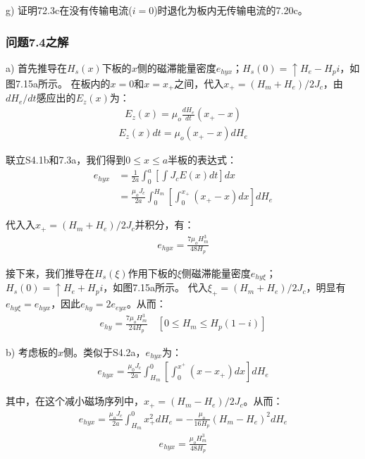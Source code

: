 g) 证明72.3c在没有传输电流($i=0$)时退化为板内无传输电流的7.20c。


\subsubsection{问题7.4之解}
a) 首先推导在$H_s(x)$下板的$x$侧的磁滞能量密度$e_{hyx}$；$H_s(0)=\uparrow H_e-H_p i$，如图7.15a所示。
在板内的$x=0$和$x=x_+$之间，代入$x_+=(H_m+H_e)/2J_c$，由$dH_e/dt$感应出的$E_z(x)$为：
\begin{align*}%
E_z(x)=\mu_o\frac{dH_e}{dt}(x_+-x) \tag{S4.1a}
\end{align*}
\begin{align*}%
E_z(x)dt=\mu_o(x_+-x)dH_e \tag{S4.1b}
\end{align*}

联立S4.1b和7.3a，我们得到$0\le x\le a$半板的表达式：
\begin{align*}%
e_{hyx}&=\frac{1}{2a}\int_{0}^{a}\left[\int J_cE(x)dt\right]dx\\
&=\frac{\mu_oJ_c}{2a}\int_{0}^{H_m}\left[\int_{0}^{x_+}(x_+-x)dx\right]dH_e \tag{S4.2a}
\end{align*}

代入入$x_+=(H_m+H_e)/2J_c$并积分，有：
\begin{align*}%
e_{hyx}=\frac{7\mu_oH_{m}^{3}}{48H_p} \tag{S4.2b}
\end{align*}

接下来，我们推导在$H_s(\xi)$作用下板的$\xi$侧磁滞能量密度$e_{hy\xi}$；$H_s(0)=\uparrow H_e+H_p i$，如图7.15a所示。
代入$\xi_+=(H_m+H_e)/2J_c$，明显有$e_{hy\xi}=e_{hyx}$，因此$e_{hy}=2e_{eyx}$。从而：
\begin{align*}%
e_{hy}=\frac{7\mu_oH_{m}^{3}}{24H_p}  \quad  [0\leq H_m\leq H_p(1-i)] \tag{7.22a}
\end{align*}

b) 考虑板的$x$侧。类似于S4.2a，$e_{hyx}$为：
\begin{align*}
e_{hyx}=\frac{\mu_0 J_c}{2a}\int_{H_m}^{0}\left[\int_{0}^{x^+}(x-x_+)dx\right]dH_e \tag{S4.3a}
\end{align*}

其中，在这个减小磁场序列中，$x_+=(H_m-H_e)/2J_c$。从而：
\begin{align*}%
e_{hyx}=\frac{\mu_oJ_c}{2a}\int_{H_m}^{0}x_{+}^{2}dH_e=-\frac{\mu_o}{16H_p}(H_m-H_e)^2dH_e  \tag{S4.3b}
\end{align*}
\begin{align*}
e_{hyx}=\frac{\mu_oH_{m}^{3}}{48H_p} \tag{S4.3c}
\end{align*}

